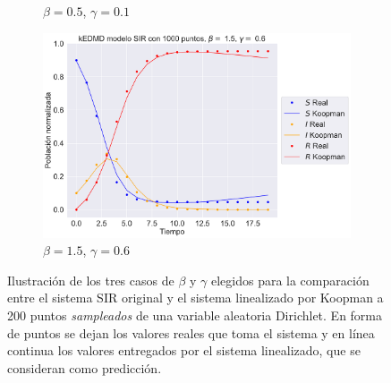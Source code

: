 \begin{figure}[htbp]
\begin{subfigure}[b]{0.45\textwidth}
        \caption{$\beta=0.5$, $\gamma = 0.1$}
        \label{fig:SIR2}
    \end{subfigure}
    \hfill
    \begin{subfigure}[b]{0.45\textwidth}
        \centering
        \includegraphics[width=\textwidth]{img/content/chapter3/SIR3.pdf}
        \caption{$\beta=1.5$, $\gamma = 0.6$}
    \end{subfigure}
    \caption{Ilustración de los tres casos de $\beta$ y $\gamma$ elegidos para la comparación entre el sistema SIR original y el sistema linealizado por Koopman a 200 puntos \textit{sampleados} de una variable aleatoria Dirichlet. En forma de puntos se dejan los valores reales que toma el sistema y en línea continua los valores entregados por el sistema linealizado, que se consideran como predicción.}
    \label{fig:Comp_traj_SIR}
\end{figure}

